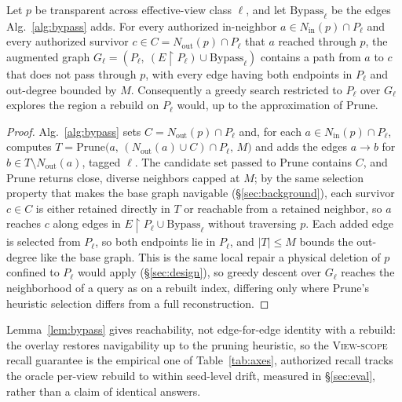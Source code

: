 \documentclass[sigconf, nonacm, review]{acmart}
\newcommand{\Nout}{N_{\mathrm{out}}}
\newcommand{\Nin}{N_{\mathrm{in}}}
\begin{document}
\begin{lemma}
\label{lem:bypass}
Let $p$ be transparent across effective-view class $\ell$, and let
$\mathrm{Bypass}_\ell$ be the edges Alg.~\ref{alg:bypass} adds. For every
authorized in-neighbor $a\in\Nin(p)\cap P_\ell$ and every authorized survivor
$c\in C=\Nout(p)\cap P_\ell$ that $a$ reached through $p$, the augmented graph
$G_\ell=(P_\ell,\ (E\!\restriction\! P_\ell)\cup\mathrm{Bypass}_\ell)$ contains
a path from $a$ to $c$ that does not pass through $p$, with every edge having
both endpoints in $P_\ell$ and out-degree bounded by $M$. Consequently a
greedy search restricted to $P_\ell$ over $G_\ell$ explores the region a
rebuild on $P_\ell$ would, up to the approximation of $\mathrm{Prune}$.
\end{lemma}
\begin{proof}
Alg.~\ref{alg:bypass} sets $C=\Nout(p)\cap P_\ell$ and, for each
$a\in\Nin(p)\cap P_\ell$, computes $T=\mathrm{Prune}\big(a,\,(\Nout(a)\cup
C)\cap P_\ell,\,M\big)$ and adds the edges $a\to b$ for $b\in T\setminus
\Nout(a)$, tagged $\ell$. The candidate set passed to $\mathrm{Prune}$ contains
$C$, and $\mathrm{Prune}$ returns close, diverse neighbors capped at $M$; by
the same selection property that makes the base graph navigable
(\S\ref{sec:background}), each survivor $c\in C$ is either retained directly in
$T$ or reachable from a retained neighbor, so $a$ reaches $c$ along edges in
$E\!\restriction\!P_\ell\cup\mathrm{Bypass}_\ell$ without traversing $p$. Each
added edge is selected from $P_\ell$, so both endpoints lie in $P_\ell$, and
$|T|\le M$ bounds the out-degree like the base graph. This is the same local
repair a physical deletion of $p$ confined to $P_\ell$ would apply
(\S\ref{sec:design}), so greedy descent over $G_\ell$ reaches the neighborhood
of a query as on a rebuilt index, differing only where $\mathrm{Prune}$'s
heuristic selection differs from a full reconstruction.
\end{proof}

\begin{remark}
\label{rem:recall}
Lemma~\ref{lem:bypass} gives reachability, not edge-for-edge identity with a
rebuild: the overlay restores navigability up to the pruning heuristic, so the
\textsc{View-scope} recall guarantee is the empirical one of
Table~\ref{tab:axes}, authorized recall tracks the oracle per-view rebuild
to within seed-level drift, measured in \S\ref{sec:eval}, rather than a
claim of identical answers.
\end{remark}
\end{document}
